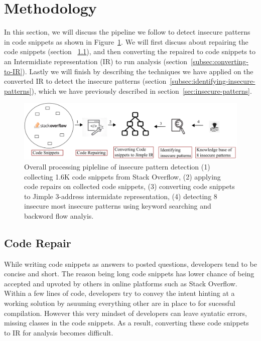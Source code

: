 \section{Methodology}
\label{sec:methodology}
In this section, we will discuss the pipeline we follow to detect insecure patterns in code snippets as shown in Figure~\ref{fig:pipeline}. 
We will first discuss about repairing the code snippets (section ~\ref{subsec:code-repair}), and then converting the repaired to code snippets to an Intermidiate representation (IR) to run analysis (section~\ref{subsec:converting-to-IR}). 
Lastly we will finish by describing the techniques we have applied on the converted IR to detect the insecure patterns (section~\ref{subsec:identifying-insecure-patterns}), which we have previously described in section~\ref{sec:insecure-patterns}.     
\begin{figure}[t]
  \centering
  \includegraphics*[width=0.8\linewidth]{Figures/overall-process.png}
  \caption{Overall processing pipleline of insecure pattern detection (1) collecting 1.6K code snippets from Stack Overflow, 
  (2) applying code repairs on collected code snippets, (3) converting code snippets to Jimple 3-address intermidate representation,
  (4) detecting 8 insecure most insecure patterns using keyword searching and backword flow analyis.}
  \label{fig:pipeline}
\end{figure}


\subsection{Code Repair}
\label{subsec:code-repair}
While writing code snippets as answers to posted questions, developers tend to be concise and short. The reason being long code snippets 
has lower chance of being accepted and upvoted by others in online platforms such as Stack Overflow. Within a few lines of code, developers try to convey the 
intent hinting at a working solution by asuuming everything other are in place to for sucessful compilation. 
However this very mindset of developers can leave syntatic errors, missing classes in the code snippets. 
As a result, converting these code snippets to IR for analysis becomes difficult.

